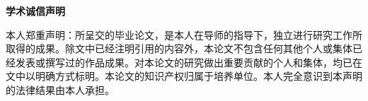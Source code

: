 \heiti\selectfont
\centering \textbf{学术诚信声明}
\songti\selectfont


本人郑重声明：所呈交的毕业论文，是本人在导师的指导下，独立进行研究工作所取得的成果。除文中已经注明引用的内容外，本论文不包含任何其他个人或集体已经发表或撰写过的作品成果。对本论文的研究做出重要贡献的个人和集体，均已在文中以明确方式标明。本论文的知识产权归属于培养单位。本人完全意识到本声明的法律结果由本人承担。

\vspace{2\baselineskip}

\begin{flushright}
	 \makebox[5cm]{\hspace{1cm}} \\
	\vspace{2\baselineskip}
	  \\
\end{flushright}






\endinput
